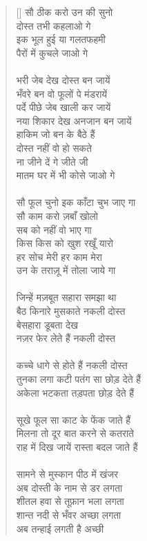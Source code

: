 \begin{verse}[\versewidth]\texthindi{
सौ ठीक करो उन की सुनो\\
दोस्त तभी कहलाओ गे\\
इक भूल हुई या गलतफहमी\\
पैरों में कुचले जाओ गे\\
\\
भरी जेब देख दोस्त बन जायें\\
भँवरे बन वो फूलों पे मंडरायें\\
पर्दे पीछे जेब खाली कर जायें\\
नया शिकार देख अनजान बन जायें\\
हाकिम जो बन के बैठे हैं\\
दोस्त नहीं वो हो सकते\\
ना जीने दें गे जीते जी\\
मातम घर में भी कोसे जाओ गे\\
\\
सौ फूल चुनो इक काँटा चुभ जाए गा\\
सौ काम करो ज़बाँ खोलो\\
सब को नहीं वो भाए गा\\
किस किस को खुश रखूँ यारो\\
हर सोच मेरी हर काम मेरा\\
उन के तराज़ू में तोला जाये गा\\
\\
जिन्हें मज़बूत सहारा समझा था\\
बैठ किनारे मुसकाते नकली दोस्त\\
बेसहारा डूबता देख\\
नज़र फेर लेते हैं नकली दोस्त\\
\\
कच्चे धागे से होते हैं नकली दोस्त\\
तुनका लगा कटी पतंग सा छोड़ देते हैं \\
अकेला भटकता तड़पता छोड़ देते हैं\\
\\
सूखे फूल सा काट के फेंक जाते हैं \\
मिलना तो दूर बात करने से कतराते\\
राह में दिख जायें रास्ता बदल जाते हैं\\
\\
सामने से मुस्कान पीठ में खंजर\\
अब दोस्ती के नाम से डर लगता\\
शीतल हवा से तूफ़ान भला लगता\\
शान्त नदी से भँवर अच्छा लगता\\
अब तन्हाई लगती है अच्छी\\
}
\end{verse}
